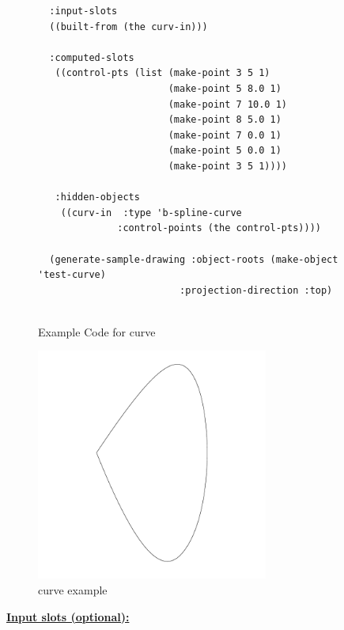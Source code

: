 \documentclass [11pt]{book}
\begin{document}
\begin{itemize}
\begin{figure}
\begin{lrbox}{\boxedverb}
\begin{minipage}{\linewidth}
{\begin{verbatim}
  :input-slots
  ((built-from (the curv-in)))
  
  :computed-slots
   ((control-pts (list (make-point 3 5 1)
                       (make-point 5 8.0 1) 
                       (make-point 7 10.0 1) 
                       (make-point 8 5.0 1) 
                       (make-point 7 0.0 1) 
                       (make-point 5 0.0 1) 
                       (make-point 3 5 1))))
   
   :hidden-objects
    ((curv-in  :type 'b-spline-curve
              :control-points (the control-pts))))

  (generate-sample-drawing :object-roots (make-object 'test-curve)
                         :projection-direction :top)
  
\end{verbatim}}
\end{minipage}
\end{lrbox}
\fbox{\usebox{\boxedverb}}

\caption{Example Code for curve}

\label{fig:example-code-curve}

\end{figure}

\begin{figure}
\begin{center}
\includegraphics[width=3in,height=3in]{../images/example-curve.pdf}
\end{center}

\caption{curve example}

\label{fig:curve}

\end{figure}





\textbf{
\underline{Input slots (optional):}}


\end{itemize}
\end{document}

